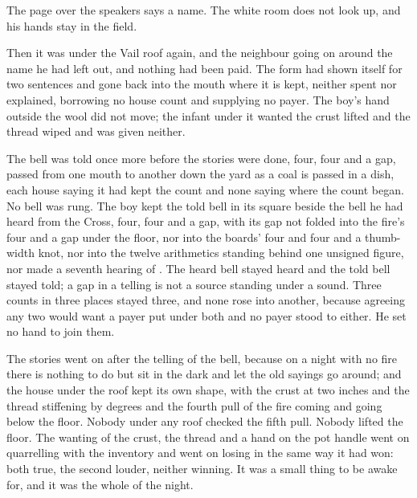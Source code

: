 The page over the speakers says a name. The white room does not look up, and his hands stay in the field.

Then it was  under the Vail roof again, and the neighbour going on around the name he had left out, and nothing had been paid. The form had shown itself for two sentences and gone back into the mouth where it is kept, neither spent nor explained, borrowing no house count and supplying no payer. The boy's hand outside the wool did not move; the infant under it wanted the crust lifted and the thread wiped and was given neither.

The bell was told once more before the stories were done, four, four and a gap, passed from one mouth to another down the yard as a coal is passed in a dish, each house saying it had kept the count and none saying where the count began. No bell was rung. The boy kept the told bell in its square beside the bell he had heard from the Cross, four, four and a gap, with its gap not folded into the fire's four and a gap under the floor, nor into the boards' four and four and a thumb-width knot, nor into the twelve arithmetics standing behind one unsigned figure, nor made a seventh hearing of . The heard bell stayed heard and the told bell stayed told; a gap in a telling is not a source standing under a sound. Three counts in three places stayed three, and none rose into another, because agreeing any two would want a payer put under both and no payer stood to either. He set no hand to join them.

The stories went on after the telling of the bell, because on a night with no fire there is nothing to do but sit in the dark and let the old sayings go around; and the house under the roof kept its own shape, with the crust at two inches and the thread stiffening by degrees and the fourth pull of the fire coming and going below the floor. Nobody under any roof checked the fifth pull. Nobody lifted the floor. The wanting of the crust, the thread and a hand on the pot handle went on quarrelling with the inventory and went on losing in the same way it had won: both true, the second louder, neither winning. It was a small thing to be awake for, and it was the whole of the night.

\scenebreak

